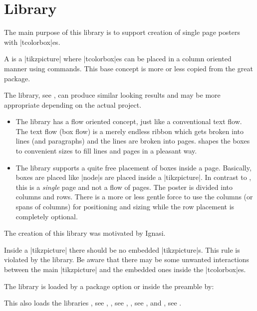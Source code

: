 \clearpage
\section{Library }\label{sec:poster}%
%

The main purpose of this library is to support creation of single page posters
with |tcolorbox|es.

A  is a |tikzpicture| where |tcolorbox|es can be
placed in a column oriented manner using  commands.
This base concept is more or less copied from the great  package.

The  library, see , can produce
similar looking results and may be more appropriate
depending on the actual project.
\begin{itemize}
\item The  library has a flow oriented concept, just like a
  conventional text flow. The text flow (box flow) is a merely endless ribbon
  which gets broken into lines (and paragraphs) and the lines are broken
  into pages.  shapes the boxes to convenient sizes to fill
  lines and pages in a pleasant way.
\item The  library supports a quite free placement of
  boxes inside a page.
  Basically, boxes are placed like |node|s are placed inside a |tikzpicture|.
  In contrast to , this is a \emph{single} page
  and not a flow of pages.
  The poster is divided into columns and rows.
  There is a more or less gentle force to use the columns (or spans of columns)
  for positioning and sizing while the row placement is completely optional.
\end{itemize}
The creation of this library was motivated by Ignasi.

\begin{marker}
Inside a |tikzpicture| there should be no embedded |tikzpicture|s.
This rule is violated by the  library. Be aware that there
may be some unwanted interactions between the main |tikzpicture| and
the embedded ones inside the |tcolorbox|es.
\end{marker}

The library is loaded by a package option or inside the preamble by:
\begin{dispListing}
\end{dispListing}
This also loads the libraries
, see ,
, see ,
, see , and
, see .


